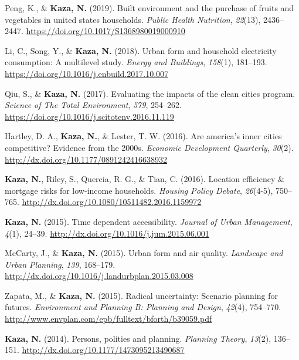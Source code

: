 \documentclass[11pt,a4paper,]{awesome-cv}
\newlength{\cslhangindent}
\newenvironment{CSLReferences}[2] %
 {\begin{list}{}{%
  \setlength{\itemindent}{0pt}
  \setlength{\leftmargin}{0pt}
  \setlength{\parsep}{0pt}
  \ifodd #1
   \setlength{\leftmargin}{\cslhangindent}
   \setlength{\itemindent}{-1\cslhangindent}
  \fi
  \setlength{\itemsep}{#2\baselineskip}}}
 {\end{list}}
\begin{document}
\begin{CSLReferences}{1}{0}
Peng, K., \& \textbf{Kaza, N.} (2019). Built environment and the
purchase of fruits and vegetables in united states households.
\emph{Public Health Nutrition}, \emph{22}(13), 2436--2447.
\url{https://doi.org/10.1017/S1368980019000910}

Li, C., Song, Y., \& \textbf{Kaza, N.} (2018). Urban form and household
electricity consumption: A multilevel study. \emph{Energy and
Buildings}, \emph{158}(1), 181--193.
\url{https://doi.org/10.1016/j.enbuild.2017.10.007}

Qiu, S., \& \textbf{Kaza, N.} (2017). Evaluating the impacts of the
clean cities program. \emph{Science of The Total Environment},
\emph{579}, 254--262.
\url{https://doi.org/10.1016/j.scitotenv.2016.11.119}

Hartley, D. A., \textbf{Kaza, N.}, \& Lester, T. W. (2016). Are
america's inner cities competitive? Evidence from the 2000s.
\emph{Economic Development Quarterly}, \emph{30}(2).
\url{http://dx.doi.org/10.1177/0891242416638932}

\textbf{Kaza, N.}, Riley, S., Quercia, R. G., \& Tian, C. (2016).
Location efficiency \& mortgage risks for low-income households.
\emph{Housing Policy Debate}, \emph{26}(4-5), 750--765.
\url{http://dx.doi.org/10.1080/10511482.2016.1159972}

\textbf{Kaza, N.} (2015). Time dependent accessibility. \emph{Journal of
Urban Management}, \emph{4}(1), 24--39.
\url{http://dx.doi.org/10.1016/j.jum.2015.06.001}

McCarty, J., \& \textbf{Kaza, N.} (2015). Urban form and air quality.
\emph{Landscape and Urban Planning}, \emph{139}, 168--179.
\url{http://dx.doi.org/10.1016/j.landurbplan.2015.03.008}

Zapata, M., \& \textbf{Kaza, N.} (2015). Radical uncertainty: Scenario
planning for futures. \emph{Environment and Planning B: Planning and
Design}, \emph{42}(4), 754--770.
\url{http://www.envplan.com/epb/fulltext/bforth/b39059.pdf}

\textbf{Kaza, N.} (2014). Persons, polities and planning. \emph{Planning
Theory}, \emph{13}(2), 136--151.
\url{http://dx.doi.org/10.1177/1473095213490687}


\end{CSLReferences}
\end{document}
